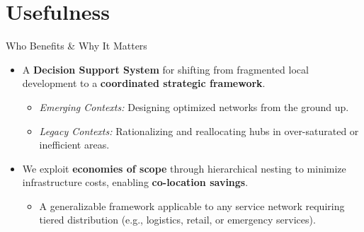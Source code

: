 \documentclass[11pt]{beamer}
\begin{document}
\section{Usefulness}
\begin{frame}{Who Benefits \& Why It Matters}
  \begin{itemize}
    \item A \textbf{Decision Support System} for shifting from fragmented local development to a \textbf{coordinated strategic framework}.
    \begin{itemize}
        \item \textit{Emerging Contexts:} Designing optimized networks from the ground up.
        \item \textit{Legacy Contexts:} Rationalizing and reallocating hubs in over-saturated or inefficient areas.
    \end{itemize}

    \vfill

    \item We exploit \textbf{economies of scope} through hierarchical nesting to minimize infrastructure costs, enabling \textbf{co-location savings}.
    \begin{itemize}
        \item A generalizable framework applicable to any service network requiring tiered distribution (e.g., logistics, retail, or emergency services).
    \end{itemize}
  \end{itemize}
  \vfill
\end{frame}

\end{document}
